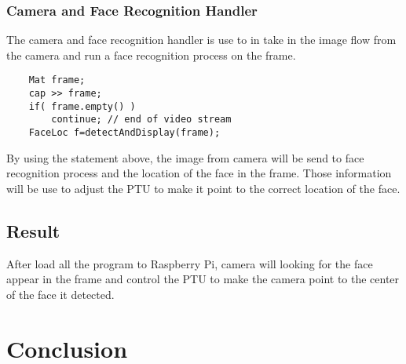 \documentclass{article}
\begin{document}
	\subsubsection{Camera and Face Recognition Handler}
		The camera and face recognition handler is use to in take in the image flow from the camera and run a face recognition process on the frame.
		\begin{lstlisting}
	Mat frame;
	cap >> frame;
	if( frame.empty() ) 
		continue; // end of video stream
	FaceLoc f=detectAndDisplay(frame);
		\end{lstlisting}
		By using the statement above, the image from camera will be send to face recognition process and the location of the face in the frame. Those information will be use to adjust the PTU to make it point to the correct location of the face.
\subsection{Result}
	After load all the program to Raspberry Pi, camera will looking for the face appear in the frame and control the PTU to make the camera point to the center of the face it detected.
\clearpage
\section{Conclusion}
\end{document}
